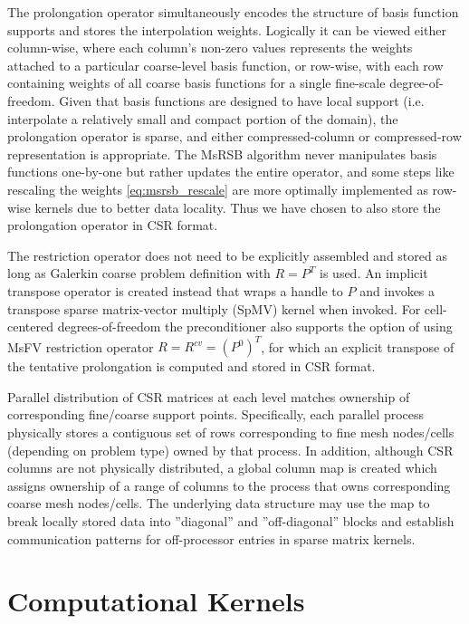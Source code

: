 The prolongation operator simultaneously encodes the structure of basis function supports and stores the interpolation weights.   Logically it can be viewed either column-wise, where each column's non-zero values represents the weights attached to a particular coarse-level basis function, or row-wise, with each row containing weights of all coarse basis functions for a single fine-scale degree-of-freedom.   Given that basis functions are designed to have local support (i.e. interpolate a relatively small and compact portion of the domain), the prolongation operator is sparse, and either compressed-column or compressed-row representation is appropriate.   The MsRSB algorithm never manipulates basis functions one-by-one but rather updates the entire operator, and some steps like rescaling the weights \eqref{eq:msrsb_rescale} are more optimally implemented as row-wise kernels due to better data locality.   Thus we have chosen to also store the prolongation operator in CSR format.

The restriction operator does not need to be explicitly assembled and stored as long as Galerkin coarse problem definition with $R = P^T$ is used.   An implicit transpose operator is created instead that wraps a handle to $P$ and invokes a transpose sparse matrix-vector multiply (SpMV) kernel when invoked.   For cell-centered degrees-of-freedom the preconditioner also supports the option of using MsFV restriction operator $R = R^{cv} = (P^0)^T$, for which an explicit transpose of the tentative prolongation is computed and stored in CSR format.

Parallel distribution of CSR matrices at each level matches ownership of corresponding fine/coarse support points.   Specifically, each parallel process physically stores a contiguous set of rows corresponding to fine mesh nodes/cells (depending on problem type) owned by that process.   In addition, although CSR columns are not physically distributed, a global column map is created which assigns ownership of a range of columns to the process that owns corresponding coarse mesh nodes/cells.   The underlying data structure may use the map to break locally stored data into ''diagonal'' and ''off-diagonal'' blocks and establish communication patterns for off-processor entries in sparse matrix kernels.

\section{Computational Kernels}
\label{sec:par_kernels}

